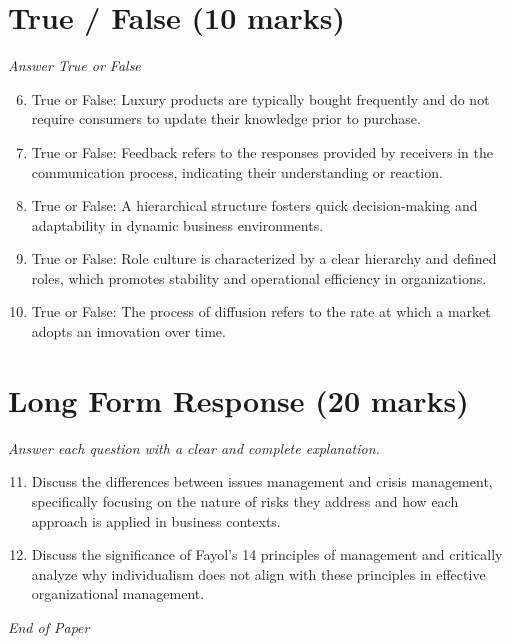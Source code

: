 \documentclass[12pt]{article}
\begin{document}
\section*{True / False (10 marks)}
\textit{Answer True or False}
\begin{enumerate}[label=\arabic*.]
\setcounter{enumi}{5}
\item True or False: Luxury products are typically bought frequently and do not require consumers to update their knowledge prior to purchase.
\item True or False: Feedback refers to the responses provided by receivers in the communication process, indicating their understanding or reaction.
\item True or False: A hierarchical structure fosters quick decision-making and adaptability in dynamic business environments.
\item True or False: Role culture is characterized by a clear hierarchy and defined roles, which promotes stability and operational efficiency in organizations.
\item True or False: The process of diffusion refers to the rate at which a market adopts an innovation over time.
\end{enumerate}

\section*{Long Form Response (20 marks)}
\textit{Answer each question with a clear and complete explanation.}
\begin{enumerate}[label=\arabic*.]
\setcounter{enumi}{10}
\item Discuss the differences between issues management and crisis management, specifically focusing on the nature of risks they address and how each approach is applied in business contexts.
\item Discuss the significance of Fayol's 14 principles of management and critically analyze why individualism does not align with these principles in effective organizational management.
\end{enumerate}

\vfill
\noindent\textit{End of Paper}
\end{document}
